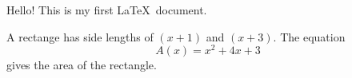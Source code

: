 \documentclass[11pt]{article}
\begin{document}
Hello! This is my first \LaTeX\ document.

A rectange has side lengths of $(x+1)$ and $(x+3)$.
The equation $${A(x)=x^2+4x+3}$$ gives the area of the rectangle.
\end{document}
